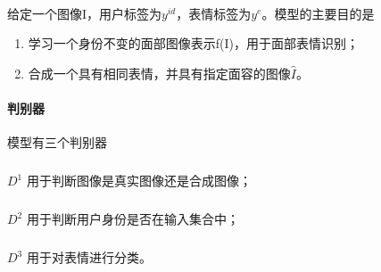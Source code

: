 \documentclass[12pt,a4paper]{article}
\begin{document}
\paragraph{} 给定一个图像I，用户标签为$y^{id}$，表情标签为$y^e$。模型的主要目的是
\begin{enumerate}
	\item 学习一个身份不变的面部图像表示f(I)，用于面部表情识别；
	\item 合成一个具有相同表情，并具有指定面容的图像$\hat I$。
\end{enumerate}

\paragraph{判别器} 模型有三个判别器
	\subparagraph{} $D^1$ 用于判断图像是真实图像还是合成图像；
	\subparagraph{} $D^2$ 用于判断用户身份是否在输入集合中；
	\subparagraph{} $D^3$ 用于对表情进行分类。







\end{document}
